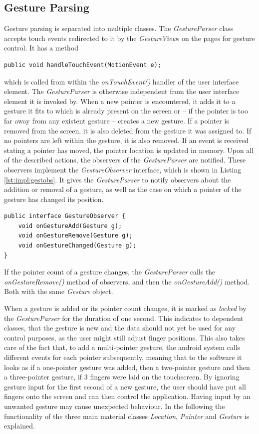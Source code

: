 \subsection{Gesture Parsing}

Gesture parsing is separated into multiple classes. The \textit{GestureParser} class accepts touch events redirected to it by the \textit{GestureView}s on the pages for gesture control. It has a method 
\begin{lstlisting}
public void handleTouchEvent(MotionEvent e);
\end{lstlisting}
which is called from within the \textit{onTouchEvent()} handler of the user interface element. The \textit{GestureParser} is otherwise independent from the user interface element it is invoked by. When a new pointer is encountered, it adds it to a gesture it fits to which is already present on the screen or -- if the pointer is too far away from any existent gesture -- creates a new gesture. If a pointer is removed from the screen, it is also deleted from the gesture it was assigned to. If no pointers are left within the gesture, it is also removed. If an event is received stating a pointer has moved, the pointer location is updated in memory. Upon all of the described actions, the observers of the \textit{GestureParser} are notified. These observers implement the \textit{GestureObserver} interface, which is shown in Listing \ref{lst:impl:gestobs}. It gives the \textit{GestureParser} to notify observers about the addition or removal of a gesture, as well as the case on which a pointer of the gesture has changed its position. 

\begin{lstlisting}[caption={The GestureObserver interface}, label=lst:impl:gestobs]
public interface GestureObserver {
	void onGestureAdd(Gesture g);
	void onGestureRemove(Gesture g);
	void onGestureChanged(Gesture g);
}
\end{lstlisting}

If the pointer count of a gesture changes, the \textit{GestureParser} calls the \textit{onGestureRemove()} method of observers, and then the \textit{onGestureAdd()} method. Both with the same \textit{Gesture} object.

When a gesture is added or its pointer count changes, it is marked as \textit{locked} by the \textit{GestureParser} for the duration of one second. This indicates to dependent classes, that the gesture is new and the data should not yet be used for any control purposes, as the user might still adjust finger positions. This also takes care of the fact that, to add a multi-pointer gesture, the android system calls different events for each pointer subsequently, meaning that to the software it looks as if a one-pointer gesture was added, then a two-pointer gesture and then a three-pointer gesture, if 3 fingers were laid on the touchscreen. By ignoring gesture input for the first second of a new gesture, the user should have put all fingers onto the screen and can then control the application. Having input by an unwanted gesture may cause unexpected behaviour. In the following the functionality of the three main material classes \textit{Location}, \textit{Pointer} and \textit{Gesture} is explained.

